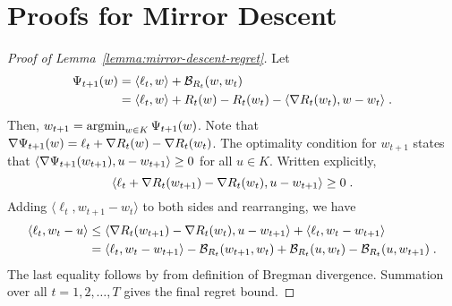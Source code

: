 \section{Proofs for Mirror Descent}
\label{section:mirror-descent-proofs}

\begin{proof}[Proof of Lemma~\ref{lemma:mirror-descent-regret}]
Let
\begin{align*}
\Psi_{t+1}(w)
& = \langle \ell_t, w \rangle + \mathcal{B}_{R_t}(w,w_t) \\
& = \langle \ell_t, w \rangle + R_t(w) - R_t(w_t) - \langle \nabla R_t(w_t) , w - w_t \rangle \; .
\end{align*}
Then, $w_{t+1} = \operatorname*{argmin}_{w \in K} \Psi_{t+1}(w)$. Note that $\nabla
\Psi_{t+1}(w) = \ell_t + \nabla R_t(w) - \nabla R_t(w_t)$. The optimality
condition for $w_{t+1}$ states that $\langle \nabla \Psi_{t+1}(w_{t+1}), u -
w_{t+1} \rangle \ge 0$ for all $u \in K$. Written explicitly,
$$
\langle \ell_t + \nabla R_t(w_{t+1}) - \nabla R_t(w_t), u - w_{t+1} \rangle \ge 0 \; .
$$
Adding $\langle \ell_t, w_{t+1} - w_t \rangle$ to both sides and rearranging, we have
\begin{align*}
\langle \ell_t, w_t - u \rangle
& \le \langle \nabla R_t(w_{t+1}) - \nabla R_t(w_t), u - w_{t+1} \rangle  + \langle \ell_t, w_t - w_{t+1} \rangle \\
& = \langle \ell_t, w_t - w_{t+1} \rangle - \mathcal{B}_{R_t}(w_{t+1}, w_t) + \mathcal{B}_{R_t}(u,w_t) - \mathcal{B}_{R_t}(u, w_{t+1}) \; .
\end{align*}
The last equality follows by from definition of Bregman divergence.  Summation
over all $t=1,2,\dots,T$ gives the final regret bound.
\end{proof}

